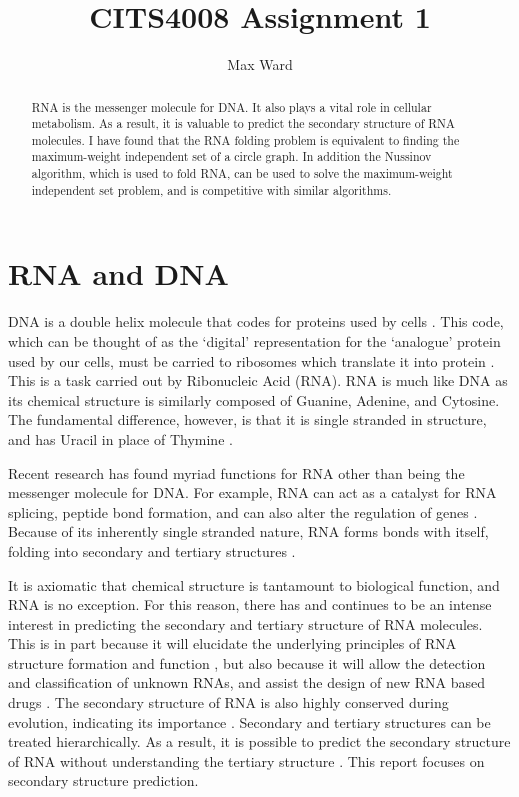 \documentclass[12pt, a4paper]{article}
\title{CITS4008 Assignment 1}
\author{Max Ward}
\date{}
\begin{document}
\maketitle

\begin{abstract}
RNA is the messenger molecule for DNA. It also plays a vital role in cellular metabolism. As a result, it is valuable to predict the secondary structure of RNA molecules. I have found that the RNA folding problem is equivalent to finding the maximum-weight independent set of a circle graph. In addition the Nussinov algorithm, which is used to fold RNA, can be used to solve the maximum-weight independent set problem, and is competitive with similar algorithms.
\end{abstract}

\section*{RNA and DNA} 
DNA is a double helix molecule that codes for proteins used by cells \cite{albertsessential}. This
code, which can be thought of as the `digital' representation for the `analogue'
protein used by our cells, must be carried to ribosomes which translate it into
protein \cite{albertsessential}. This is a task carried out by Ribonucleic Acid (RNA). RNA is much like DNA as its chemical structure is similarly composed of Guanine, Adenine, and Cytosine. The fundamental difference, however, is that it is single stranded in structure, and has Uracil in place of Thymine \cite{albertsessential}.

Recent research has found myriad functions for RNA other than being the messenger molecule for DNA. For example, RNA can act as a catalyst for RNA
splicing, peptide bond formation, and can also alter the regulation of genes
\cite{xu2012statistical}. Because of its inherently single stranded nature, RNA forms bonds with itself, folding into
secondary and tertiary structures \cite{conn1998rna}.

It is axiomatic that chemical structure is tantamount to biological function, and RNA is no exception. For this reason, there has and continues to be an intense
interest in predicting the secondary and tertiary structure of RNA
molecules. This is in part because it will elucidate the underlying principles of
RNA structure formation and function \cite{conn1998rna}, but also because it will allow the
detection and classification of unknown RNAs, and assist the design of new RNA based drugs \cite{condon2003problems}. The secondary structure of RNA
is also highly conserved during evolution, indicating its importance \cite{hofacker2008rna}. Secondary
and tertiary structures can be treated hierarchically. As a result, it is possible to
predict the secondary structure of RNA without understanding the tertiary
structure \cite{tinoco1999rna}. This report focuses on secondary structure prediction.
\end{document}
